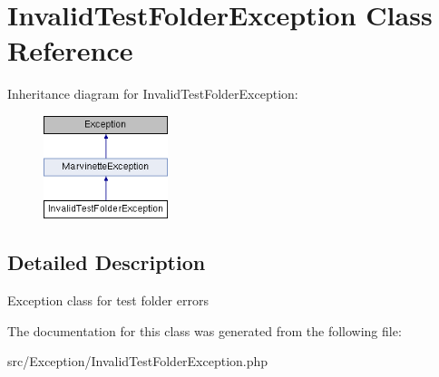 \hypertarget{classInvalidTestFolderException}{}\section{Invalid\+Test\+Folder\+Exception Class Reference}
\label{classInvalidTestFolderException}
Inheritance diagram for Invalid\+Test\+Folder\+Exception\+:\begin{figure}[H]
\begin{center}
\leavevmode
\includegraphics[height=3.000000cm]{classInvalidTestFolderException}
\end{center}
\end{figure}


\subsection{Detailed Description}
Exception class for test folder errors 

The documentation for this class was generated from the following file\+:\begin{DoxyCompactItemize}
\item 
src/\+Exception/Invalid\+Test\+Folder\+Exception.\+php\end{DoxyCompactItemize}
